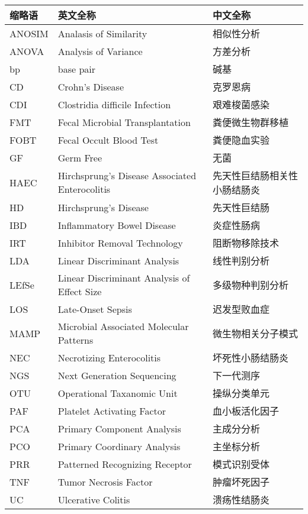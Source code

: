 \begin{nomenclaturename}
\begin{longtable}{llp{3cm}}
  \toprule
  缩略语 & 英文全称 & 中文全称 \\
  \midrule
    ANOSIM & Analasis of Similarity & 相似性分析\\
    ANOVA & Analysis of Variance & 方差分析\\
    bp & base pair & 碱基\\
    CD & Crohn’s Disease & 克罗恩病\\
    CDI &	Clostridia difficile Infection & 艰难梭菌感染\\
    FMT & Fecal Microbial Transplantation & 粪便微生物群移植\\
    FOBT & Fecal Occult Blood Test & 粪便隐血实验\\
    GF & Germ Free & 无菌\\
    HAEC & Hirchsprung’s Disease Associated Enterocolitis & 先天性巨结肠相关性小肠结肠炎\\
    HD & Hirchsprung’s Disease & 先天性巨结肠\\
    IBD & Inflammatory Bowel Disease & 炎症性肠病\\
    IRT & Inhibitor Removal Technology & 阻断物移除技术\\
    LDA & Linear Discriminant Analysis & 线性判别分析\\
    LEfSe & Linear Discriminant Analysis of Effect Size & 多级物种判别分析\\
    LOS & Late-Onset Sepsis & 迟发型败血症\\
    MAMP & Microbial Associated Molecular Patterns & 微生物相关分子模式\\
    NEC & Necrotizing Enterocolitis & 坏死性小肠结肠炎\\
    NGS & Next Generation Sequencing & 下一代测序\\
    OTU & Operational Taxanomic Unit & 操纵分类单元\\
    PAF & Platelet Activating Factor & 血小板活化因子\\
    PCA & Primary Component Analysis & 主成分分析\\
    PCO & Primary Coordinary Analysis & 主坐标分析\\
    PRR & Patterned Recognizing Receptor & 模式识别受体\\
    TNF & Tumor Necrosis Factor & 肿瘤坏死因子\\
    UC & Ulcerative Colitis & 溃疡性结肠炎 \\
    \bottomrule
\end{longtable}


\end{nomenclaturename}
